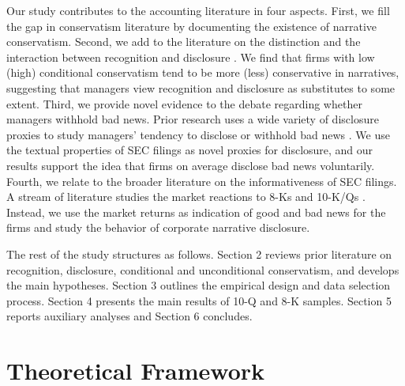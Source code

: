\documentclass[a4paper]{article}
\begin{document}
\begin{spacing}{2}
Our study contributes to the accounting literature in four aspects. First, we fill the gap in conservatism literature by documenting the existence of narrative conservatism. Second, we add to the literature on the distinction and the interaction between recognition and disclosure . We find that firms with low (high) conditional conservatism tend to be more (less) conservative in narratives, suggesting that managers view recognition and disclosure as substitutes to some extent. Third, we provide novel evidence to the debate regarding whether managers withhold bad news. Prior research uses a wide variety of disclosure proxies to study managers' tendency to disclose or withhold bad news \cite{skinnerWhyFirmsVoluntarily1994, skinnerEarningsDisclosuresStockholder1997, kothariManagersWithholdBad2009, segalAreManagersStrategic2016, baoManagersDiscloseWithhold2019}. We use the textual properties of SEC filings as novel proxies for disclosure, and our results support the idea that firms on average disclose bad news voluntarily. Fourth, we relate to the broader literature on the informativeness of SEC filings. A stream of literature studies the market reactions to 8-Ks  and 10-K/Qs . Instead, we use the market returns as indication of good and bad news for the firms and study the behavior of corporate narrative disclosure.

The rest of the study structures as follows. Section 2 reviews prior literature on recognition, disclosure, conditional and unconditional conservatism, and develops the main hypotheses. Section 3 outlines the empirical design and data selection process. Section 4 presents the main results of 10-Q and 8-K samples. Section 5 reports auxiliary analyses and Section 6 concludes.

\section{Theoretical Framework}

\end{spacing}
\end{document}

